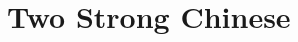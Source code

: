 \section{Two Strong Chinese}

\inputminted[firstline=228, lastline=369]{cpp}{code/2StrongChinese.cpp}
